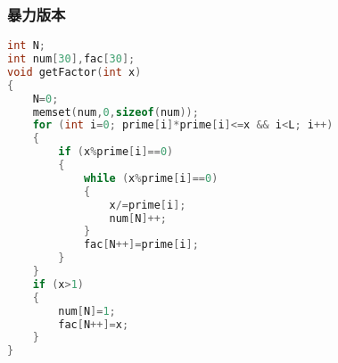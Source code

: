     \subsubsection{暴力版本}
	\begin{lstlisting}[language=c++]
int N;
int num[30],fac[30];
void getFactor(int x)
{
    N=0;
    memset(num,0,sizeof(num));
    for (int i=0; prime[i]*prime[i]<=x && i<L; i++)
    {
        if (x%prime[i]==0)
        {
            while (x%prime[i]==0)
            {
                x/=prime[i];
                num[N]++;
            }
            fac[N++]=prime[i];
        }
    }
    if (x>1)
    {
        num[N]=1;
        fac[N++]=x;
    }
}
	\end{lstlisting}